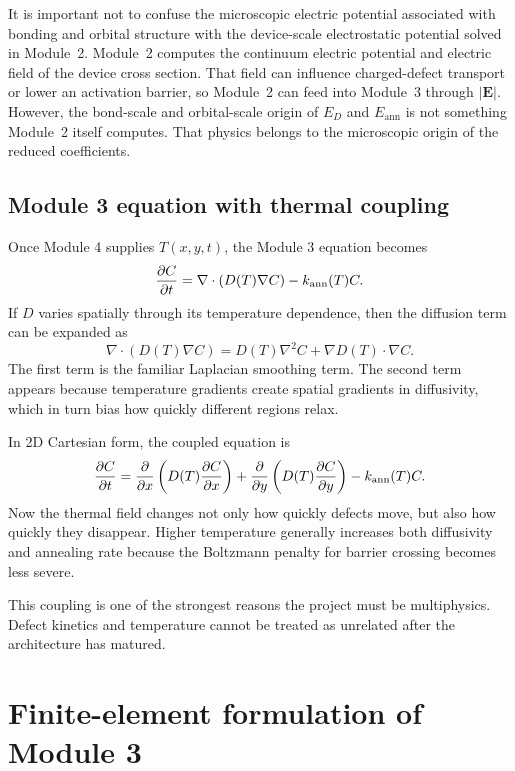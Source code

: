 \documentclass[11pt]{article}
\begin{document}
It is important not to confuse the microscopic electric potential associated with bonding and orbital structure with the device-scale electrostatic potential solved in Module~2. Module~2 computes the continuum electric potential and electric field of the device cross section. That field can influence charged-defect transport or lower an activation barrier, so Module~2 can feed into Module~3 through $|\mathbf{E}|$. However, the bond-scale and orbital-scale origin of $E_D$ and $E_{\mathrm{ann}}$ is not something Module~2 itself computes. That physics belongs to the microscopic origin of the reduced coefficients.

\subsection{Module 3 equation with thermal coupling}

Once Module 4 supplies $T(x,y,t)$, the Module 3 equation becomes
\begin{equation}
\pdv{C}{t}
=
\nabla \cdot \left(D(T)\nabla C\right) - k_{\mathrm{ann}}(T)C.
\end{equation}
If $D$ varies spatially through its temperature dependence, then the diffusion term can be expanded as
\begin{equation}
\nabla \cdot \left(D(T)\nabla C\right) = D(T)\nabla^2 C + \nabla D(T) \cdot \nabla C.
\end{equation}
The first term is the familiar Laplacian smoothing term. The second term appears because temperature gradients create spatial gradients in diffusivity, which in turn bias how quickly different regions relax.

In 2D Cartesian form, the coupled equation is
\begin{equation}
\pdv{C}{t}
=
\pdv{}{x}\left(D(T)\pdv{C}{x}\right)
+
\pdv{}{y}\left(D(T)\pdv{C}{y}\right)
-
k_{\mathrm{ann}}(T)C.
\end{equation}
Now the thermal field changes not only how quickly defects move, but also how quickly they disappear. Higher temperature generally increases both diffusivity and annealing rate because the Boltzmann penalty for barrier crossing becomes less severe.

This coupling is one of the strongest reasons the project must be multiphysics. Defect kinetics and temperature cannot be treated as unrelated after the architecture has matured.


\section{Finite-element formulation of Module 3}
\end{document}
